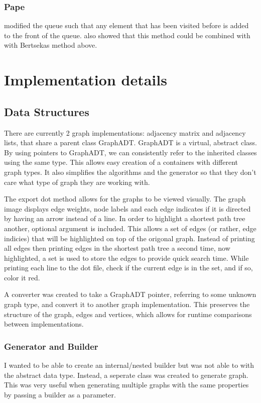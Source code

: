 \documentclass{article}
\begin{document}
\subsubsection{Pape}
\cite{Pape} modified the queue such that any element that has been visited before is added to the front of the queue. \cite{Hao} also showed that this method could be combined with with Bertsekas method above. 

\section{Implementation details}
\subsection{Data Structures}
There are currently 2 graph implementations: adjacency matrix and adjacency lists, that share a parent class GraphADT. GraphADT is a virtual, abstract class. By using pointers to GraphADT, we can consistently refer to the inherited classes using the same type. This allows easy creation of a containers with different graph types. It also simplifies the algorithms and the generator so that they don't care what type of graph they are working with.

The export dot method allows for the graphs to be viewed visually. The graph image displays edge weights, node labels and each edge indicates if it is directed by having an arrow instead of a line. In order to highlight a shortest path tree another, optional argument is included. This allows a set of edges (or rather, edge indicies) that will be highlighted on top of the origonal graph. Instead of printing all edges then printing edges in the shortest path tree a second time, now highlighted, a set is used to store the edges to provide quick search time. While printing each line to the dot file, check if the current edge is in the set, and if so, color it red. 

A converter was created to take a GraphADT pointer, referring to some unknown graph type, and convert it to another graph implementation. This preserves the structure of the graph, edges and vertices, which allows for runtime comparisons between implementations.

\subsubsection{Generator and Builder}
I wanted to be able to create an internal/nested builder but was not able to with the abstract data type. Instead, a seperate class was created to generate graph. This was very useful when generating multiple graphs with the same properties by passing a builder as a parameter.
\end{document}
